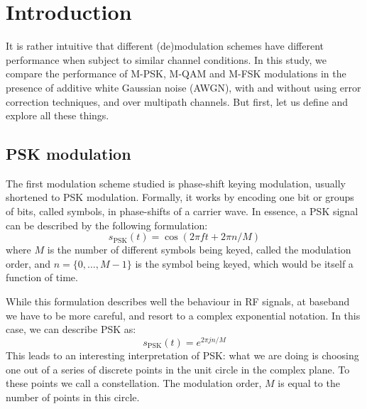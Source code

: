 
\section{Introduction}

It is rather intuitive that different (de)modulation schemes have different
performance when subject to similar channel conditions. In this study, we compare
the performance of M-PSK, M-QAM and M-FSK modulations in the presence of additive
white Gaussian noise (AWGN), with and without using error correction techniques,
and over multipath channels. But first, let us define and explore all these
things.

\subsection{PSK modulation}

The first modulation scheme studied is phase-shift keying modulation, usually
shortened to PSK modulation. Formally, it works by encoding one bit or groups of
bits, called symbols, in phase-shifts of a carrier wave. In essence, a PSK signal
can be described by the following formulation:
\begin{equation}
    s_{\text{PSK}}(t) = \cos \left( 2\pi f t + 2\pi n/M \right)
\end{equation}
where \(M\) is the number of different symbols being keyed, called the modulation
order, and \(n = \{0,\ldots,M-1\}\) is the symbol being keyed, which would be
itself a function of time.

While this formulation describes well the behaviour in RF signals, at baseband we
have to be more careful, and resort to a complex exponential notation. In this
case, we can describe PSK as:
\begin{equation}
    s_{\text{PSK}}(t) = e^{2\pi j n/M}
\end{equation}
This leads to an interesting interpretation of PSK\@: what we are doing is
choosing one out of a series of discrete points in the unit circle in the complex
plane. To these points we call a constellation. The modulation order, \(M\) is
equal to the number of points in this circle.

